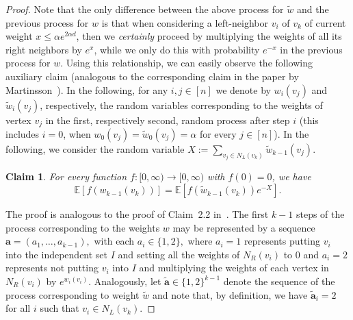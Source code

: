 \documentclass[10pt]{amsart}
\newenvironment{claimproof}[1][\proofname]{\proof[#1]\renewcommand{\qedsymbol}{$\blacksquare$}}{\endproof}
\newtheorem{claim}[theorem]{Claim}
\theoremstyle{definition}
\begin{document}
\begin{proof}
Note that the only difference between the above process for $\tilde{w}$ and the previous process for $w$ is that when considering a left-neighbor $v_i$ of $v_k$ of current weight $x\le \alpha e^{2 \alpha d}$, then we \emph{certainly} proceed by multiplying the weights of all its right neighbors by $e^{x}$, while we only do this with probability $e^{-x}$ in the previous process for $w$. Using this relationship, we can easily observe the following auxiliary claim (analogous to the corresponding claim in the paper by Martinsson~\cite{martinsson}). In the following, for any $i, j \in [n]$ we denote by $w_i(v_j)$ and $\tilde{w}_i(v_j)$, respectively, the random variables corresponding to the weights of vertex $v_j$ in the first, respectively second, random process after step $i$ (this includes $i=0$, when $w_0(v_j)=\tilde{w}_0(v_j)=\alpha$ for every $j\in [n]$). In the following, we consider the random variable $X:=\sum_{v_j\in N_L(v_k)}\tilde{w}_{k-1}(v_j)$.  
\begin{claim} \label{claim:f(w)}
For every function $f:[0,\infty)\rightarrow [0,\infty)$ with $f(0)=0$, we have 
$$\mathbb{E}[f(w_{k-1}(v_k))]= \mathbb{E}[f(\tilde{w}_{k-1}(v_k))e^{-X}].$$
\end{claim}
\begin{claimproof}
    The proof is analogous to the proof of Claim~2.2 in~\cite{martinsson}. The first $k-1$ steps of the process corresponding to the weights $w$ may be represented by a sequence $\mathbf{a} = (a_1, \dots, a_{k-1}),$ with each $a_i \in \{1, 2\},$ where $a_i = 1$ represents putting $v_i$ into the independent set $I$ and setting all the weights of $N_R(v_i)$ to $0$ and $a_i = 2$ represents not putting $v_i$ into $I$ and multiplying the weights of each vertex in $N_R(v_i)$ by $e^{w_i(v_i)}$. Analogously, let $\tilde{\mathbf{a}} \in \{1, 2\}^{k-1}$ denote the sequence of the process corresponding to weight $\tilde{w}$ and note that, by definition, we have $\tilde{\mathbf{a}}_i = 2$ for all $i$ such that $v_i \in N_L(v_k)$.


\end{claimproof}
\end{proof}
\end{document}
